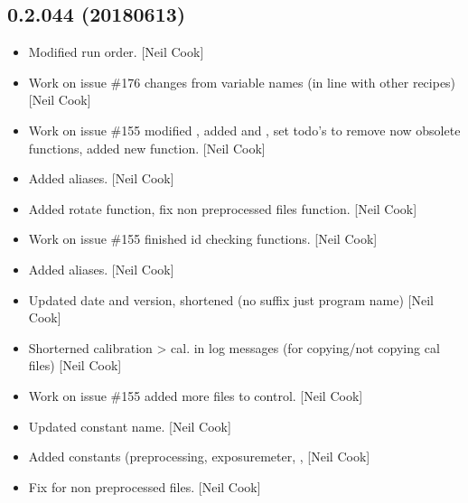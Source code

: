 \documentclass[a4paper,10pt,english]{report}
\begin{document}
\subsection{0.2.044 (2018\sphinxhyphen{}06\sphinxhyphen{}13)}
\label{\detokenize{misc/changelog:id441}}\begin{itemize}
\item {} 
Modified run order. {[}Neil Cook{]}

\item {} 
Work on issue \#176 \sphinxhyphen{} changes from variable names (in line with other
recipes) {[}Neil Cook{]}

\item {} 
Work on issue \#155 \sphinxhyphen{} modified , added
 and , set todo’s to remove now
obsolete functions, added new  function. {[}Neil Cook{]}

\item {} 
Added aliases. {[}Neil Cook{]}

\item {} 
Added rotate function, fix non pre\sphinxhyphen{}processed files function. {[}Neil
Cook{]}

\item {} 
Work on issue \#155 \sphinxhyphen{} finished id checking functions. {[}Neil Cook{]}

\item {} 
Added aliases. {[}Neil Cook{]}

\item {} 
Updated date and version, shortened  (no suffix just program
name) {[}Neil Cook{]}

\item {} 
Shorterned calibration \textendash{}\textgreater{} cal. in log messages (for copying/not
copying cal files) {[}Neil Cook{]}

\item {} 
Work on issue \#155 \sphinxhyphen{} added more files to control. {[}Neil Cook{]}

\item {} 
Updated constant name. {[}Neil Cook{]}

\item {} 
Added constants (preprocessing, exposuremeter, ,  {[}Neil
Cook{]}

\item {} 
Fix for non pre\sphinxhyphen{}processed files. {[}Neil Cook{]}


\end{itemize}
\end{document}
